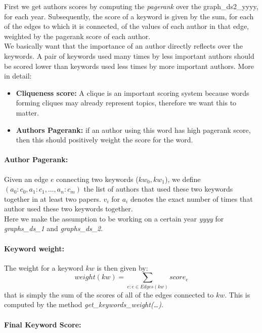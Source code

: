 \documentclass{article}
\begin{document}
First we get authors scores by computing the \textit{pagerank} over the graph\_ds2\_yyyy, for each year.
Subsequently, the score of a keyword is given by the sum, for each of the edges to which it is connected, of the values of each author in that edge, weighted by the pagerank score of each author.\\
We basically want that the importance of an author directly reflects over the keywords. A pair of keywords used many times by less important authors should be scored lower than keywords used less times by more important authors.
More in detail:
\begin{itemize}
	\item \textbf{Cliqueness score:} A clique is an important scoring system because words forming cliques may already represent topics, therefore we want this to matter.
	\item \textbf{Authors Pagerank:} if an author using this word has high pagerank score, then this should positively weight the score for the word.
\end{itemize}

\paragraph{Author Pagerank:}
Given an edge $e$ connecting two keywords ($kw_0, kw_1$), we define $(a_0:c_0, a_1:c_1, \dots, a_n:c_m)$ the list of authors that used these two keywords together in at least two papers. $v_i$ for $a_i$ denotes the exact number of times that author used these two keywords together.\\
Here we make the assumption to be working on a certain year \textit{yyyy} for \textit{graphs\_ds\_1} and \textit{graphs\_ds\_2}.


\paragraph{Keyword weight:}
The weight for a keyword $kw$ is then given by:
\begin{equation}
	weight(kw) = \sum_{e:e \in Edges(kw)} score_e
\end{equation}
that is simply the sum of the scores of all of the edges connected to $kw$. This is computed by the method \textit{get\_keywords\_weight(\dots)}.\\

\paragraph{Final Keyword Score:}
\end{document}
